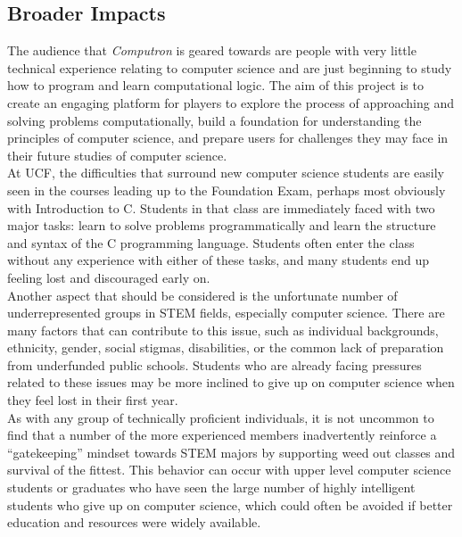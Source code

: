 \subsection{Broader Impacts}

The audience that \textit{Computron} is geared towards are people with very little technical experience relating to computer science and are just beginning to study how to program and learn computational logic. The aim of this project is to create an engaging platform for players to explore the process of approaching and solving problems computationally, build a foundation for understanding the principles of computer science, and prepare users for challenges they may face in their future studies of computer science.\\

At UCF, the difficulties that surround new computer science students are easily seen in the courses leading up to the Foundation Exam, perhaps most obviously with Introduction to C. Students in that class are immediately faced with two major tasks: learn to solve problems programmatically and learn the structure and syntax of the C programming language. Students often enter the class without any experience with either of these tasks, and many students end up feeling lost and discouraged early on.\\

Another aspect that should be considered is the unfortunate number of underrepresented groups in STEM fields, especially computer science. There are many factors that can contribute to this issue, such as individual backgrounds, ethnicity, gender, social stigmas, disabilities, or the common lack of preparation from underfunded public schools. Students who are already facing pressures related to these issues may be more inclined to give up on computer science when they feel lost in their first year.\\

As with any group of technically proficient individuals, it is not uncommon to find that a number of the more experienced members inadvertently reinforce a “gatekeeping” mindset towards STEM majors by supporting weed out classes and survival of the fittest. This behavior can occur with upper level computer science students or graduates who have seen the large number of highly intelligent students who give up on computer science, which could often be avoided if better education and resources were widely available.\\

